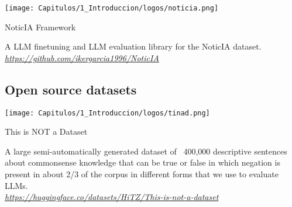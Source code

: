 \begin{resources}
    {
    \begin{adjustbox}{valign=c}
    \texttt{[image: Capitulos/1\_Introduccion/logos/noticia.png]}
    \end{adjustbox}
    \begin{adjustbox}{valign=c}
    \begin{minipage}{\textwidth}
    NoticIA Framework
    \end{minipage}
    \end{adjustbox}
    }
    A LLM finetuning and LLM evaluation library for the NoticIA dataset.  \\
    \textit{\href{https://github.com/ikergarcia1996/NoticIA}{https://github.com/ikergarcia1996/NoticIA}}
\end{resources}

\subsection{Open source datasets}

\begin{resources}
    {
    \begin{adjustbox}{valign=c}
    \texttt{[image: Capitulos/1\_Introduccion/logos/tinad.png]}
    \end{adjustbox}
    \begin{adjustbox}{valign=c}
    \begin{minipage}{\textwidth}
    This is NOT a Dataset
    \end{minipage}
    \end{adjustbox}
    }
    A large semi-automatically generated dataset of ~400,000 descriptive sentences about commonsense knowledge that can be true or false in which negation is present in about 2/3 of the corpus in different forms that we use to evaluate LLMs.  \\
    \textit{\href{https://huggingface.co/datasets/HiTZ/This-is-not-a-dataset}{https://huggingface.co/datasets/HiTZ/This-is-not-a-dataset}}
\end{resources}

